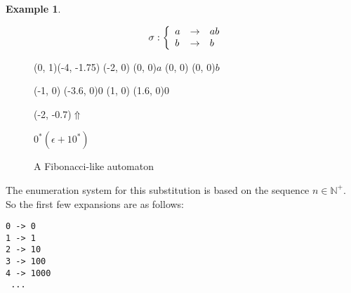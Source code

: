 \documentclass{article}
\newcommand{\spaces}{\begin{picture}(9,0)(0,0)\end{picture}}
\theoremstyle{definition}
\newtheorem{example}[theorem]{Example}
\begin{document}
\begin{example}
\begin{figure}[t]
\begin{eqnarray*}
\spaces
\sigma: \left\{ \begin{array}{lll}
a &\rightarrow& ab\\
b &\rightarrow& b
\end{array} \right.
\end{eqnarray*}
\begin{graph}(0, 1)(-4, -1.75)
  (-2, 0) (0, 0){$a$}
  (0, 0)  (0, 0){$b$}

  (-1, 0) \freetext(-3.6, 0){0}
   
  (1, 0) \freetext(1.6, 0){0}

  \freetext(-2, -0.7){$\Uparrow$}
\end{graph} $0^* (\epsilon + 10^*)$
\caption{A Fibonacci-like automaton}
\label{fig:fibonacci_brother}
\end{figure}

The enumeration system for this substitution is based on the sequence 
$n \in \mathbb{N}^+$. So the first few expansions are as follows:
\begin{verbatim}
0 -> 0
1 -> 1
2 -> 10
3 -> 100
4 -> 1000
 ...
\end{verbatim}
\end{example}
\end{document}

